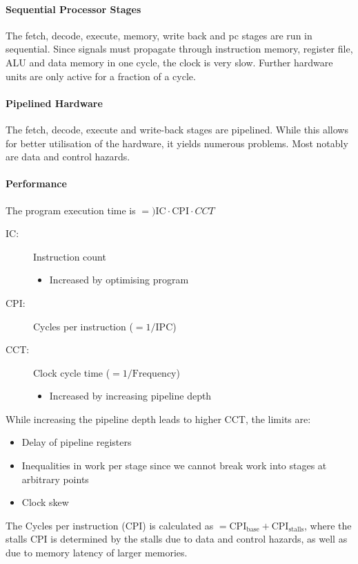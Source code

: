 \paragraph{Sequential Processor Stages}
The fetch, decode, execute, memory, write back and pc stages are run in sequential. Since signals must propagate through instruction memory, register file, ALU and data memory in one cycle, the clock is very slow. Further hardware units are only active for a fraction of a cycle.

\paragraph{Pipelined Hardware}
The fetch, decode, execute and write-back stages are pipelined. While this allows for better utilisation of the hardware, it yields numerous problems. Most notably are data and control hazards.

\paragraph{Performance}
The program execution time is $=) \text{IC} \cdot \text{CPI} \cdot CCT$
\begin{description}
    \item[IC:] Instruction count
        \begin{itemize}
            \item Increased by optimising program
        \end{itemize}
    \item[CPI:] Cycles per instruction ($= 1/\text{IPC}$)
    \item[CCT:] Clock cycle time ($=1/\text{Frequency}$)
        \begin{itemize}
            \item Increased by increasing pipeline depth
        \end{itemize}
\end{description}

 While increasing the pipeline depth leads to higher CCT, the limits are:
 \begin{itemize}
     \item Delay of pipeline registers
     \item Inequalities in work per stage since we cannot break work into stages at arbitrary points
     \item Clock skew
 \end{itemize}

The Cycles per instruction (CPI) is calculated as $=\text{CPI}_{\text{base}} + \text{CPI}_{\text{stalls}}$, where the stalls CPI is determined by the stalls due to data and control hazards, as well as due to memory latency of larger memories.

